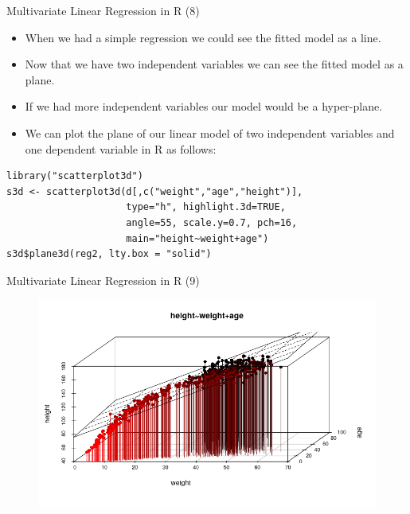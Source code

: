 \documentclass[handout]{beamer}
\begin{document}
\begin{frame}[fragile]{Multivariate Linear Regression in R (8)}
\scriptsize{
\begin{itemize}
 \item When we had a simple regression we could see the fitted model as a line.
 \item Now that we have two independent variables we can see the fitted model as a plane.
 \item If we had more independent variables our model would be a hyper-plane.
 \item We can plot the plane of our linear model of two independent variables and one dependent variable in R as follows:
 \end{itemize}

\begin{verbatim}
library("scatterplot3d")
s3d <- scatterplot3d(d[,c("weight","age","height")],
                     type="h", highlight.3d=TRUE,
                     angle=55, scale.y=0.7, pch=16, 
                     main="height~weight+age")
s3d$plane3d(reg2, lty.box = "solid")
\end{verbatim}




} 
\end{frame}

\begin{frame}{Multivariate Linear Regression in R (9)}
 
\begin{figure}[h!]
	\centering
	\includegraphics[scale=0.55]{pics/reg3d.png}
\end{figure}
 
\end{frame}
\end{document}
